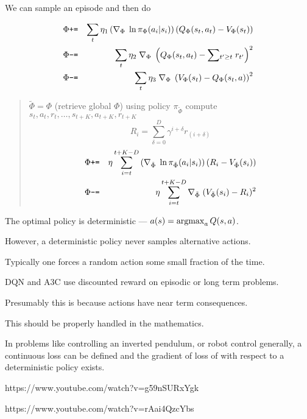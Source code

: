{We can sample an episode and then do

\begin{eqnarray*}
  \Phi  &\mbox{\tt +=} & \sum_t \eta_1\left(\nabla_{\Phi}\;\ln \pi_{\Phi}(a_i|s_i)\right)(Q_\Phi(s_t,a_t) - V_\Phi(s_t))\\
  \Phi & \mbox{\tt -=} & \sum_t \eta_2 \;\nabla_{\Phi}\;\left(Q_\Phi(s_t,a_t) - \sum \!_{t' \geq t}\; r_{t'}\right)^2 \\
  \Phi & \mbox{\tt -=} & \sum_t \eta_3 \;\nabla_{\Phi}\;\left(V_\Phi(s_t) - Q_\Phi(s_t,a)\right)^2 \\
\end{eqnarray*}



\begin{quotation}
  \noindent $\tilde{\Phi} = \Phi$ (retrieve global $\Phi$)\newline
  \noindent using policy $\pi_{\tilde{\Phi}}$ compute $s_t,a_t,r_t,\ldots,s_{t+K},a_{t+K},r_{t+K}$
  $$R_i = \sum_{\delta=0}^D \gamma^{i+\delta} r_{(i+\delta)}$$
  \begin{eqnarray*}
  \Phi  &\mbox{\tt +=} & \eta \sum_{i=t}^{t+K-D} \left(\nabla_{\tilde{\Phi}}\;\ln \pi_{\tilde{\Phi}}(a_i|s_i)\right)\left(R_i - V_{\tilde{\Phi}}(s_i)\right)\\
  \Phi & \mbox{\tt -=} & \eta \sum_{i=t}^{t+K-D} \nabla_{\tilde{\Phi}}\;(V_{\tilde{\Phi}}(s_i) - R_i)^2
  \end{eqnarray*}
\end{quotation}


The optimal policy is deterministic --- $a(s) = \operatorname*{argmax}_a Q(s,a)$.

\vfill
However, a deterministic policy never samples alternative actions.

\vfill
Typically one forces a random action some small fraction of the time.



DQN and A3C use discounted reward on episodic or long term problems.

\vfill
Presumably this is because actions have near term consequences.

\vfill
This should be properly handled in the mathematics.


In problems like controlling an inverted pendulum, or robot control generally,
a continuous loss can be defined and the gradient of loss of with respect to a deterministic policy exists.


https://www.youtube.com/watch?v=g59nSURxYgk

https://www.youtube.com/watch?v=rAai4QzcYbs




}




